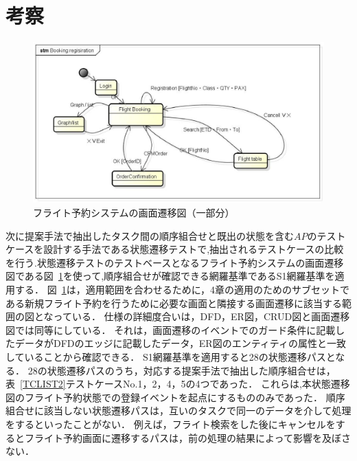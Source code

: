 \documentclass[a4paper,12pt]{jreport}
\begin{document}
\section{考察}

\begin{figure}[h]
\begin{center}
\includegraphics[scale=0.3]{screentransition.eps}
\end{center}
\caption{フライト予約システムの画面遷移図（一部分）}
\label{fig:STD}
\end{figure}

次に提案手法で抽出したタスク間の順序組合せと既出の状態を含む$AP$のテストケースを設計する手法である状態遷移テストで,抽出されるテストケースの比較を行う.状態遷移テストのテストベースとなるフライト予約システムの画面遷移図である図~\ref{fig:STD}を使って,順序組合せが確認できる網羅基準であるS1網羅基準を適用する．
図~\ref{fig:STD}は，適用範囲を合わせるために，4章の適用のためのサブセットである新規フライト予約を行うために必要な画面と隣接する画面遷移に該当する範囲の図となっている．
仕様の詳細度合いは，DFD，ER図，CRUD図と画面遷移図では同等にしている．
それは，画面遷移のイベントでのガード条件に記載したデータがDFDのエッジに記載したデータ，ER図のエンティティの属性と一致していることから確認できる．
S1網羅基準を適用すると28の状態遷移パスとなる．
28の状態遷移パスのうち，対応する提案手法で抽出した順序組合せは，表~\ref{TCLIST2}テストケースNo.1，2，4，5の4つであった．
これらは,本状態遷移図のフライト予約状態での登録イベントを起点にするもののみであった．
順序組合せに該当しない状態遷移パスは，互いのタスクで同一のデータを介して処理をするといったことがない．
例えば，フライト検索をした後にキャンセルをするとフライト予約画面に遷移するパスは，前の処理の結果によって影響を及ぼさない．
\end{document}
